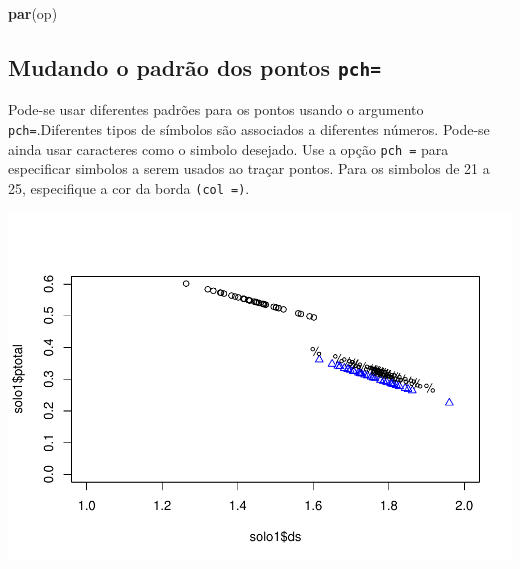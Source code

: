 \documentclass[]{book}
\newenvironment{Shaded}{\begin{snugshade}}{\end{snugshade}}
\newcommand{\DataTypeTok}[1]{\textcolor[rgb]{0.13,0.29,0.53}{#1}}
\newcommand{\DecValTok}[1]{\textcolor[rgb]{0.00,0.00,0.81}{#1}}
\newcommand{\FloatTok}[1]{\textcolor[rgb]{0.00,0.00,0.81}{#1}}
\newcommand{\KeywordTok}[1]{\textcolor[rgb]{0.13,0.29,0.53}{\textbf{#1}}}
\newcommand{\NormalTok}[1]{#1}
\newcommand{\OperatorTok}[1]{\textcolor[rgb]{0.81,0.36,0.00}{\textbf{#1}}}
\begin{document}
\begin{Shaded}
\begin{Highlighting}[]
\KeywordTok{par}\NormalTok{(op)}
\end{Highlighting}
\end{Shaded}

\hypertarget{mudando-o-padrao-dos-pontos-pch}{%
\subsection{\texorpdfstring{Mudando o padrão dos pontos \texttt{pch=}}{Mudando o padrão dos pontos pch=}}\label{mudando-o-padrao-dos-pontos-pch}}

Pode-se usar diferentes padrões para os pontos usando o argumento \texttt{pch=}.Diferentes tipos de símbolos são associados a diferentes números. Pode-se ainda usar caracteres como o simbolo desejado.
Use a opção \texttt{pch\ =} para especificar simbolos a serem usados ao traçar pontos. Para os simbolos de 21 a 25, especifique a cor da borda \texttt{(col\ =)}.

\begin{Shaded}
\end{Shaded}

\includegraphics{TudodoR_files/figure-latex/unnamed-chunk-155-1.pdf}
\end{document}
